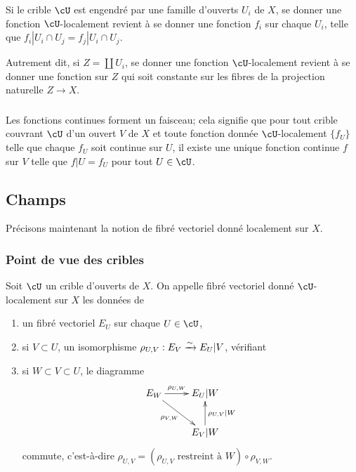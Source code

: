 Si le crible $\cU$ est engendré par une famille d'ouverts $U_i$ de $X$, se 
donner une fonction $\cU$-localement revient à se donner une fonction $f_i$ 
sur chaque $U_i$, telle que $f_i|{U_i\cap U_j} = f_j|{U_i\cap U_j}$. 

Autrement dit, si $Z=\coprod U_i$, se donner une fonction $\cU$-localement 
revient à se donner une fonction sur $Z$ qui soit constante sur les fibres de 
la projection naturelle $Z\to X$. 





\subsubsection{}\label{I:1-2-3}

Les fonctions continues forment un faisceau; cela signifie que pour tout crible 
couvrant $\cU$ d'un ouvert $V$ de $X$ et toute fonction donnée 
$\cU$-localement $\{f_U\}$ telle que chaque $f_U$ soit continue sur $U$, il 
existe une unique fonction continue $f$ sur $V$ telle que $f|U=f_U$ pour tout 
$U\in \cU$.










\subsection{Champs}\label{I:1-3}

Précisons maintenant la notion de fibré vectoriel donné localement sur $X$. 





\subsubsection{Point de vue des cribles}\label{I:1-3-1}

Soit $\cU$ un crible d'ouverts de $X$. On appelle fibré vectoriel donné 
$\cU$-localement sur $X$ les données de 
\begin{enumerate}[\indent a)]
  \item un fibré vectoriel $E_U$ sur chaque $U\in \cU$, 
  \item si $V\subset U$, un isomorphisme $\rho_{U,V} : E_V\xrightarrow\sim E_U|V$, vérifiant 
  \item si $W\subset V\subset U$, le diagramme 
    \[\xymatrix{
      E_W \ar[r]^-{\rho_{U,W}} \ar[dr]_-{\rho_{V,W}}
        & E_U|W \\
      & E_V|W \ar[u]_-{\rho_{U,V}|W}
    }\]
    commute, c'est-à-dire 
    $\rho_{U,V} = (\mbox{$\rho_{U,V}$ restreint à $W$}) \circ \rho_{V,W}$. 
\end{enumerate}





